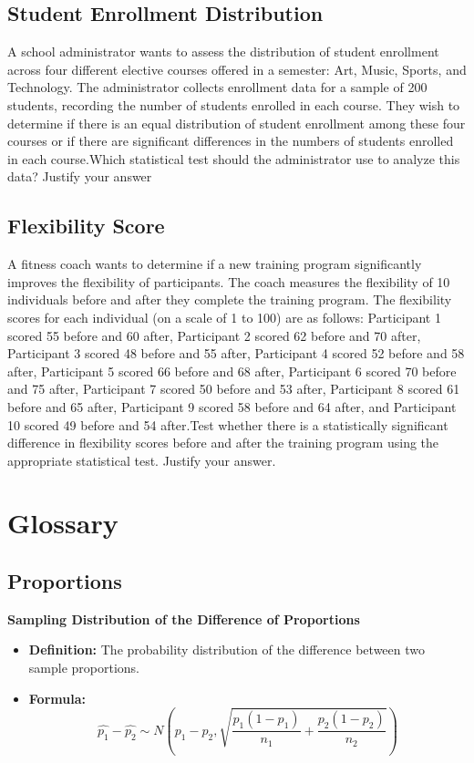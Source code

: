 \documentclass{article}
\begin{document}
\subsection*{Student Enrollment Distribution}
A school administrator wants to assess the distribution of student enrollment across four different elective courses offered in a semester: Art, Music, Sports, and Technology. The administrator collects enrollment data for a sample of 200 students, recording the number of students enrolled in each course. They wish to determine if there is an equal distribution of student enrollment among these four courses or if there are significant differences in the numbers of students enrolled in each course.Which statistical test should the administrator use to analyze this data? 
Justify your answer



\subsection*{Flexibility Score}
A fitness coach wants to determine if a new training program significantly improves the flexibility of participants. The coach measures the flexibility of 10 individuals before and after they complete the training program. The flexibility scores for each individual (on a scale of 1 to 100) are as follows: Participant 1 scored 55 before and 60 after, Participant 2 scored 62 before and 70 after, Participant 3 scored 48 before and 55 after, Participant 4 scored 52 before and 58 after, Participant 5 scored 66 before and 68 after, Participant 6 scored 70 before and 75 after, Participant 7 scored 50 before and 53 after, Participant 8 scored 61 before and 65 after, Participant 9 scored 58 before and 64 after, and Participant 10 scored 49 before and 54 after.Test whether there is a statistically significant difference in flexibility scores before and after the training program using the appropriate statistical test.
Justify your answer.


\section*{Glossary}

\subsection*{Proportions}

\textbf{Sampling Distribution of the Difference of Proportions}
\begin{itemize}
    \item \textbf{Definition:} The probability distribution of the difference between two sample proportions.
    \item \textbf{Formula:}
    \[
    \hat{p_1} - \hat{p_2} \sim N\left(p_1 - p_2, \sqrt{\frac{p_1(1-p_1)}{n_1} + \frac{p_2(1-p_2)}{n_2}}\right)
    \]
\end{itemize}
\end{document}
